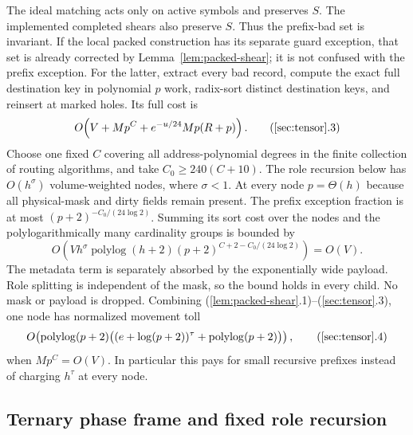 The ideal matching acts only on active symbols and preserves $S$. The implemented completed shears also preserve $S$. Thus the prefix-bad set is invariant. If the local packed construction has its separate guard exception, that set is already corrected by Lemma~\ref{lem:packed-shear}; it is not confused with the prefix exception. For the latter, extract every bad record, compute the exact full destination key in polynomial $p$ work, radix-sort distinct destination keys, and reinsert at marked holes. Its full cost is
\[
 O\!\left(V+Mp^C+e^{-u/24}Mp(R+p)\right).
 \tag{\ref{sec:tensor}.3}
\]
Choose one fixed $C$ covering all address-polynomial degrees in the finite collection of routing algorithms, and take $C_0\ge240(C+10)$. The role recursion below has $O(h^\sigma)$ volume-weighted nodes, where $\sigma<1$. At every node $p=\Theta(h)$ because all physical-mask and dirty fields remain present. The prefix exception fraction is at most $(p+2)^{-C_0/(24\log 2)}$. Summing its sort cost over the nodes and the polylogarithmically many cardinality groups is bounded by
\[
 O\!\left(Vh^\sigma\operatorname{polylog}(h+2)
      (p+2)^{C+2-C_0/(24\log 2)}\right)=O(V).
\]
The metadata term is separately absorbed by the exponentially wide payload. Role splitting is independent of the mask, so the bound holds in every child. No mask or payload is dropped. Combining (\ref{lem:packed-shear}.1)--(\ref{sec:tensor}.3), one node has normalized movement toll
\[
 O\!\left(\operatorname{polylog}(p+2)\big((e+\log(p+2))^\tau+\operatorname{polylog}(p+2)\big)\right),
 \tag{\ref{sec:tensor}.4}
\]
when $Mp^C=O(V)$. In particular this pays for small recursive prefixes instead of charging $h^\tau$ at every node.

\subsection{Ternary phase frame and fixed role recursion}

